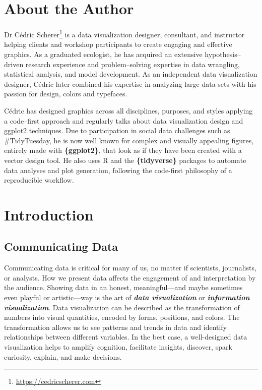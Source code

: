 \documentclass[
]{krantz}
\renewcommand{\href}[2]{#2\footnote{\url{#1}}}
\begin{document}
\hypertarget{about-the-author}{%
\chapter*{About the Author}\label{about-the-author}}


\href{https://cedricscherer.com}{Dr Cédric Scherer} is a data visualization designer, consultant, and instructor helping clients and workshop participants to create engaging and effective graphics. As a graduated ecologist, he has acquired an extensive hypothesis--driven research experience and problem--solving expertise in data wrangling, statistical analysis, and model development. As an independent data visualization designer, Cédric later combined his expertise in analyzing large data sets with his passion for design, colors and typefaces.

Cédric has designed graphics across all disciplines, purposes, and styles applying a code--first approach and regularly talks about data visualization design and ggplot2 techniques. Due to participation in social data challenges such as \#TidyTuesday, he is now well known for complex and visually appealing figures, entirely made with \textbf{\{ggplot2\}}, that look as if they have been created with a vector design tool. He also uses R and the \textbf{\{tidyverse\}} packages to automate data analyses and plot generation, following the code-first philosophy of a reproducible workflow.

\mainmatter

\hypertarget{introduction}{%
\chapter{Introduction}\label{introduction}}

\hypertarget{communication}{%
\section{Communicating Data}\label{communication}}

Communicating data is critical for many of us, no matter if scientists, journalists, or analysts. How we present data affects the engagement of and interpretation by the audience. Showing data in an honest, meaningful---and maybe sometimes even playful or artistic---way is the art of \textbf{\emph{data visualization}} or \textbf{\emph{information visualization}}. Data visualization can be described as the transformation of numbers into visual quantities, encoded by forms, positions, and colors. The transformation allows us to see patterns and trends in data and identify relationships between different variables. In the best case, a well-designed data visualization helps to amplify cognition, facilitate insights, discover, spark curiosity, explain, and make decisions.
\end{document}
